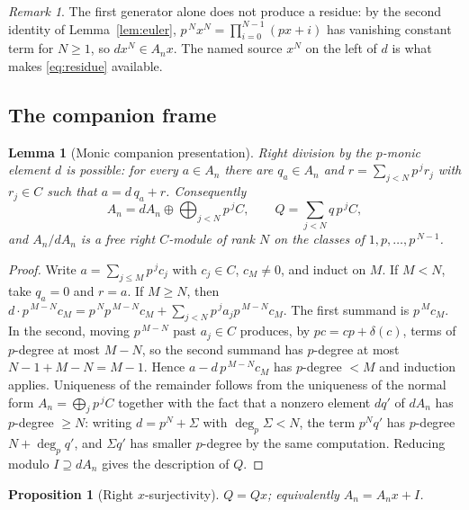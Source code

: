 \documentclass[11pt]{article}
\theoremstyle{plain}
\newtheorem{lemma}[theorem]{Lemma}
\newtheorem{proposition}[theorem]{Proposition}
\theoremstyle{definition}
\theoremstyle{remark}
\newtheorem{remark}[theorem]{Remark}
\theoremstyle{plain}
\begin{document}
\begin{remark}\label{rem:sourceneeded}
The first generator alone does not produce a residue: by the second identity of
Lemma~\ref{lem:euler}, $p^{\,N}x^N=\prod_{i=0}^{N-1}(px+i)$ has vanishing
constant term for $N\ge1$, so $dx^N\in A_nx$. The named source $x^N$ on the
left of $d$ is what makes \eqref{eq:residue} available.
\end{remark}

\subsection*{The companion frame}

\begin{lemma}[Monic companion presentation]\label{lem:companion}
Right division by the $p$-monic element $d$ is possible: for every $a\in A_n$
there are $q_a\in A_n$ and $r=\sum_{j<N}p^{\,j}r_j$ with $r_j\in C$ such that
$a=d\,q_a+r$. Consequently
\begin{equation}\label{eq:frame}
  A_n=dA_n\oplus\bigoplus_{j<N}p^{\,j}C,
  \qquad
  Q=\sum_{j<N}q\,p^{\,j}C ,
\end{equation}
and $A_n/dA_n$ is a free right $C$-module of rank $N$ on the classes of
$1,p,\dots,p^{\,N-1}$.
\end{lemma}

\begin{proof}
Write $a=\sum_{j\le M}p^{\,j}c_j$ with $c_j\in C$, $c_M\neq0$, and induct on
$M$. If $M<N$, take $q_a=0$ and $r=a$. If $M\ge N$, then
$d\cdot p^{\,M-N}c_M=p^{\,N}p^{\,M-N}c_M+\sum_{j<N}p^{\,j}a_jp^{\,M-N}c_M$.
The first summand is $p^{\,M}c_M$. In the second, moving $p^{\,M-N}$ past
$a_j\in C$ produces, by $pc=cp+\delta(c)$, terms of $p$-degree at most
$M-N$, so the second summand has $p$-degree at most $N-1+M-N=M-1$. Hence
$a-d\,p^{\,M-N}c_M$ has $p$-degree $<M$ and induction applies. Uniqueness of
the remainder follows from the uniqueness of the normal form
$A_n=\bigoplus_jp^{\,j}C$ together with the fact that a nonzero element
$dq'$ of $dA_n$ has $p$-degree $\ge N$: writing $d=p^N+\Sigma$ with
$\deg_p\Sigma<N$, the term $p^Nq'$ has $p$-degree $N+\deg_pq'$, and
$\Sigma q'$ has smaller $p$-degree by the same computation.
Reducing modulo $I\supseteq dA_n$ gives the description of $Q$.
\end{proof}

\begin{proposition}[Right $x$-surjectivity]\label{prop:Qx}
$Q=Qx$; equivalently $A_n=A_nx+I$.
\end{proposition}
\end{document}

